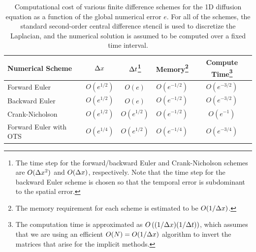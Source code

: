 \documentclass[oneeqnum,onefignum,onetabnum,onethmnum]{siamltex}
\begin{document}
\begin{table}[tb]
\caption{\label{tab:comp_perf_vs_err} 
   Computational cost of various finite difference schemes for the 1D 
   diffusion equation as a function of the global numerical error $e$.
   For all of the schemes, the standard second-order central difference 
   stencil is used to discretize the Laplacian, and the numerical 
   solution is assumed to be computed over a fixed time interval.  
}
\begin{minipage}{\textwidth}
\begin{center} \footnotesize
\renewcommand{\arraystretch}{1.5}
\begin{tabular}{|l|c|c|c|c|}
  \hline
  {\bf Numerical Scheme} & $\Delta x$ 
  & $\Delta t$\footnote{The 
   time step for the forward/backward Euler and Crank-Nicholson schemes 
   are $O(\Delta x^2)$ and $O(\Delta x)$, respectively.  Note that the 
   time step for the backward Euler scheme is chosen so that the temporal 
   error is subdominant to the spatial error.}
  & {\bf Memory}\footnote{The memory requirement for each scheme is estimated 
    to be $O(1/\Delta x)$.} 
  & {\bf Compute Time}\footnote{The computation time is approximated as 
    $O\left( (1/\Delta x) (1/\Delta t) \right)$, which assumes that we are using an 
    efficient $O(N) = O(1/\Delta x)$ algorithm to invert the matrices that 
    arise for the implicit methods.}  \\
  \hline 
  Forward Euler    & $O\left( e^{1/2} \right)$ 
                   & $O\left( e \right)$ 
                   & $O\left( e^{-1/2} \right)$ 
                   & $O\left( e^{-3/2} \right)$ \\
  Backward Euler   & $O\left( e^{1/2} \right)$ 
                   & $O\left( e \right)$ 
                   & $O\left( e^{-1/2} \right)$ 
                   & $O\left( e^{-3/2} \right)$ \\
  Crank-Nicholson  & $O\left( e^{1/2} \right)$ 
                   & $O\left( e^{1/2} \right)$ 
                   & $O\left( e^{-1/2} \right)$ 
                   & $O\left( e^{-1} \right)$ \\
  Forward Euler with OTS  & $O\left( e^{1/4} \right)$ 
                   & $O\left( e^{1/2} \right)$ 
                   & $O\left( e^{-1/4} \right)$ 
                   & $O\left( e^{-3/4} \right)$ \\ 
  \hline
\end{tabular}
\end{center}
\end{minipage}
\end{table}
\end{document}
